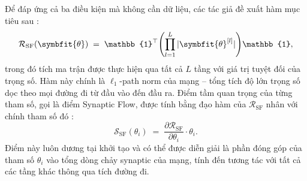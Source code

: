 Để đáp ứng cả ba điều kiện mà không cần dữ liệu, các tác giả đề xuất hàm mục
tiêu sau \cite{synflow}:
\begin{equation}
  \mathcal{R}_{\mathrm{SF}}(\symbfit{\theta})
  \;=\; \mathbb{1}^{\top}
        \!\left(\prod_{l=1}^{L} |\symbfit{\theta}^{[l]}|\right)\!
        \mathbb{1},
  \label{eq:synflow_loss}
\end{equation}
trong đó tích ma trận được thực hiện qua tất cả $L$ tầng với giá trị tuyệt
đối của trọng số. Hàm này chính là $\ell_1$-path norm của mạng
-- tổng tích độ lớn trọng số dọc theo mọi đường
đi từ đầu vào đến đầu ra. Điểm tầm quan trọng của từng tham số, gọi là điểm
Synaptic Flow, được tính bằng đạo hàm của $\mathcal{R}_{\mathrm{SF}}$
nhân với chính tham số đó \cite{synflow}:
\begin{equation}
  \mathcal{S}_{\mathrm{SF}}(\theta_i)
  \;=\; \frac{\partial \mathcal{R}_{\mathrm{SF}}}{\partial \theta_i} \cdot \theta_i.
  \label{eq:synflow_score}
\end{equation}
Điểm này luôn dương tại khởi tạo và có thể được diễn giải là phần đóng góp
của tham số $\theta_i$ vào tổng dòng chảy synaptic của mạng, tính đến tương
tác với tất cả các tầng khác thông qua tích đường đi.


